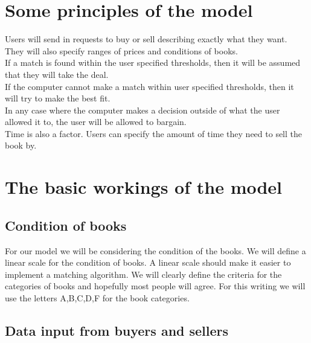 \section{Some principles of the model}

Users will send in requests to buy or sell describing exactly what
they want.\\
They will also specify ranges of prices and conditions of
books.\\
If a match is found within the user specified thresholds, then it will
be assumed that they will take the deal.\\
If the computer cannot make a match within user specified thresholds,
then it will try to make the best fit.\\
In any case where the computer makes a decision outside of what the
user allowed it to, the user will be allowed to bargain.\\
Time is also a factor.  Users can specify the amount of time they need
to sell the book by.\\

\section{The basic workings of the model}

\subsection{Condition of books}

For our model we will be considering the condition of the books.  We will
define a linear scale for the condition of books.  A linear scale should make
it easier to implement a matching algorithm.  We will clearly define the
criteria for the categories of books and hopefully most people will agree.  For
this writing we will use the letters A,B,C,D,F for the book categories.\\

\subsection{Data input from buyers and sellers}

